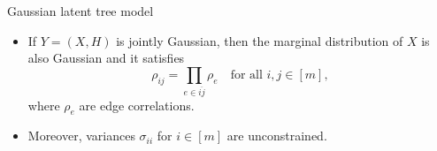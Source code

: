\documentclass[dvipsnames,aspectratio=169]{beamer} %
\begin{document}



\begin{frame}{Gaussian latent tree model}
\begin{itemize}
\item If $Y=(X,H)$ is jointly Gaussian, then the marginal distribution of $X$ is also Gaussian and it satisfies
$$
\rho_{ij}=\prod_{e\in \overline{ij}} \rho_{e}\quad\mbox{for all }i,j\in [m],
$$
where $\rho_{e}$ are edge correlations. 
\item Moreover, variances $\sigma_{ii}$ for $i\in [m]$ are unconstrained.
\end{itemize}
\end{frame}
\end{document}
